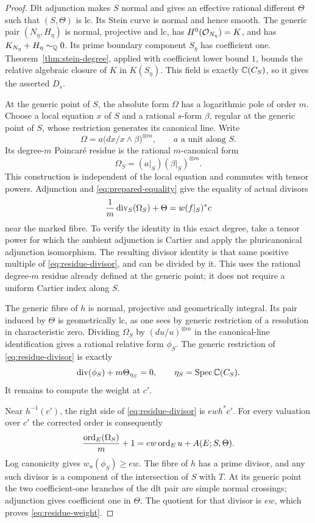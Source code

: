 \begin{proof}
Dlt adjunction \cite{KM} makes $S$ normal and gives an effective rational
different $\Theta$ such that $(S,\Theta)$ is lc.  Its Stein curve
is normal and hence smooth.  The generic pair $(N_\eta,H_\eta)$ is
normal, projective and lc, has $H^0(\mathcal O_{N_\eta})=K$, and has
$K_{N_\eta}+H_\eta\sim_{\mathbb Q}0$.  Its prime boundary component $S_\eta$
has coefficient one.  Theorem~\ref{thm:stein-degree}, applied with
coefficient lower bound $1$, bounds the relative algebraic closure
of $K$ in $K(S_\eta)$.  This field is exactly $\mathbb C(C_S)$, so it gives
the asserted $D_s$.

At the generic point of $S$, the absolute form $\Omega$ has a
logarithmic pole of order $m$.  Choose a local equation $x$ of $S$ and
a rational $s$-form $\beta$, regular at the generic point of $S$, whose
restriction generates its canonical line.  Write
\[
 \Omega=a\bigl(dx/x\wedge\beta\bigr)^{\otimes m},
 \qquad a\text{ a unit along }S.
\]
Its degree-$m$ Poincar\'e residue is the rational $m$-canonical form
\[
                 \Omega_S=(a|_S)(\beta|_S)^{\otimes m}.
\]
This construction is independent of the local equation and commutes
with tensor powers.  Adjunction and
\eqref{eq:prepared-equality} give the equality of actual divisors
\begin{equation}\label{eq:residue-divisor}
                 \frac1m\operatorname{div}_S(\Omega_S)+\Theta
                           =w(f|_S)^*c
\end{equation}
near the marked fibre.  To verify the identity in this exact degree,
take a tensor power for which the ambient adjunction is Cartier and
apply the pluricanonical adjunction isomorphism.  The resulting divisor
identity is that same positive multiple of \eqref{eq:residue-divisor}, and can
be divided by it.  This uses the rational degree-$m$ residue already
defined at the generic point; it does not require a uniform Cartier
index along $S$.

The generic fibre of $h$ is normal, projective and geometrically
integral.  Its pair induced by $\Theta$ is geometrically lc, as one
sees by generic restriction of a resolution in characteristic zero.
Dividing $\Omega_S$ by $(du/u)^{\otimes m}$ in the canonical-line
identification gives a rational relative form $\phi_S$.  The generic
restriction of \eqref{eq:residue-divisor} is exactly
\[
              \operatorname{div}(\phi_S)+m\Theta_{\eta_S}=0,
              \qquad \eta_S=\operatorname{Spec}\mathbb C(C_S).
\]
It remains to compute the weight at $c'$.

Near $h^{-1}(c')$, the right side of
\eqref{eq:residue-divisor} is $ew h^*c'$.  For every valuation over
$c'$ the corrected order is consequently
\[
       \frac{\operatorname{ord}_E(\Omega_S)}m+1
          =ew\operatorname{ord}_Eu+A(E;S,\Theta).
\]
Log canonicity gives $w_u(\phi_S)\ge ew$.  The fibre of $h$ has a
prime divisor, and any such divisor is a component of the intersection
of $S$ with $T$.  At its generic point the two coefficient-one
branches of the dlt pair are simple normal crossings; adjunction gives
coefficient one in $\Theta$.  The quotient for that divisor is $ew$,
which proves \eqref{eq:residue-weight}.
\end{proof}

